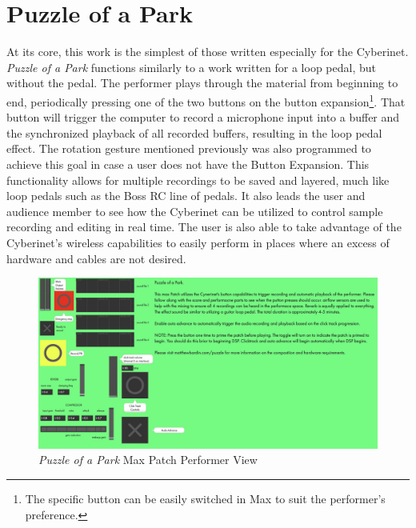 \section{Puzzle of a Park}
At its core, this work is the simplest of those written especially for the Cyberinet. \textit{Puzzle of a Park} functions similarly to a work written for a loop pedal, but without the pedal. The performer plays through the material from beginning to end, periodically pressing one of the two buttons on the button expansion\footnote{The specific button can be easily switched in Max to suit the performer's preference.}. That button will trigger the computer to record a microphone input into a buffer and the synchronized playback of all recorded buffers, resulting in the loop pedal effect. The rotation gesture mentioned previously was also programmed to achieve this goal in case a user does not have the Button Expansion. This functionality allows for multiple recordings to be saved and layered, much like loop pedals such as the Boss RC line of pedals. It also leads the user and audience member to see how the Cyberinet can be utilized to control sample recording and editing in real time. The user is also able to take advantage of the Cyberinet's wireless capabilities to easily perform in places where an excess of hardware and cables are not desired.

\begin{figure}
    \centering
    \includegraphics[scale=0.2]{diagrams/maxPatches/puzzlePresentation.jpg}
    \caption{\textit{Puzzle of a Park} Max Patch Performer View}
    \label{fig:puzzlePatchPres}
\end{figure}

